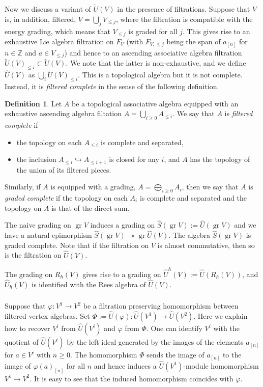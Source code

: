 \documentclass{amsart}
\theoremstyle{definition}
\newtheorem{defi}[Thm]{Definition}
\newcommand{\sss}{\subsubsection{}}
\newcommand{\gr}{\operatorname{gr}}
\newcommand{\Z}{\mathbb{Z}}
\numberwithin{equation}{section}
\begin{document}
\sss\label{SSS:filtered_enveloping}
Now we discuss a variant of $\widetilde{U}(V)$ in the presence of filtrations. Suppose that $V$ is, in addition, filtered, $V=\bigcup_{j}V_{\leqslant j}$, where the filtration is compatible with the energy grading, which means that $V_{\leqslant j}$ is graded for all $j$. This gives rise to an exhaustive Lie algebra filtration on $F_V$ (with $F_{V,\leqslant j}$ being the span of $a_{[n]}$ for $n\in \Z$ and $a\in V_{\leqslant j}$) and hence to an ascending associative algebra  filtration $\widetilde{U}(V)_{\leqslant i}\subset \widetilde{U}(V)$. We note that the latter is non-exhaustive, and we define $\widehat{U}(V)$ as $\bigcup_i \widetilde{U}(V)_{\leqslant i}$.  This is a topological algebra but it is not complete. Instead, it is {\it filtered complete} in the sense of the following definition. 

\begin{defi}\label{defi:filtered_complete}
Let $A$ be a topological associative algebra equipped with an exhaustive ascending algebra filtation $A=\bigcup_{i\geqslant 0}A_{\leqslant i}$. We say that $A$ is {\it filtered complete} if
\begin{itemize}
\item 
the topology on each $A_{\leqslant i}$ is complete and separated, 
\item the inclusion $A_{\leqslant i}\hookrightarrow A_{\leqslant i+1}$ is closed for any $i$, and $A$ has the topology of the union of its filtered pieces.
\end{itemize}
Similarly, if $A$ is equipped with a grading, $A=\bigoplus_{i\geqslant 0}A_i$, then we say that $A$ is {\it graded complete} if the topology on each $A_i$ is complete and separated and the topology on $A$ is that of the direct sum. 
\end{defi}

The naive grading on $\gr V$ induces a grading on $\widehat{S}(\gr V):=\widehat{U}(\gr V)$ and we have a natural epimorphism $\widehat{S}(\gr V)\twoheadrightarrow \gr \widehat{U}(V)$. The algebra $\widehat{S}(\gr V)$ is graded complete. Note  that if the filtration on $V$ is almost commutative, then so is the filtration on $\widehat{U}(V)$. 

The grading on $R_\hbar(V)$ gives rise to a grading on $\widehat{U}^\hbar(V):=\widehat{U}(R_\hbar(V))$, and 
$\widehat{U}_\hbar(V)$ is identified with the Rees algebra of $\widehat{U}(V)$.

\sss\label{SSS_from_univ_to_vertex} Suppose that $\varphi:V^1\rightarrow V^2$ be a filtration preserving homomorphism between filtered vertex algebras. Set $\Phi:=\widehat{U}(\varphi):\widehat{U}(V^1)\rightarrow \widehat{U}(V^2)$. Here we explain how to recover $V^i$ from $\widehat{U}(V^i)$ and $\varphi$ from $\Phi$. One can identify $V^i$ with the quotient of $\widehat{U}(V^i)$ by the left ideal generated by the images of the elements $a_{[n]}$ for $a\in V^i$ with $n\geqslant 0$. The homomorphism $\Phi$ sends the image of $a_{[n]}$ to the image of $\varphi(a)_{[n]}$ for all $n$ and hence induces a  $\widehat{U}(V^1)$-module homomorphism $V^1\rightarrow V^2$. It is easy to see that the induced homomorphism coincides with $\varphi$. 
\end{document}
